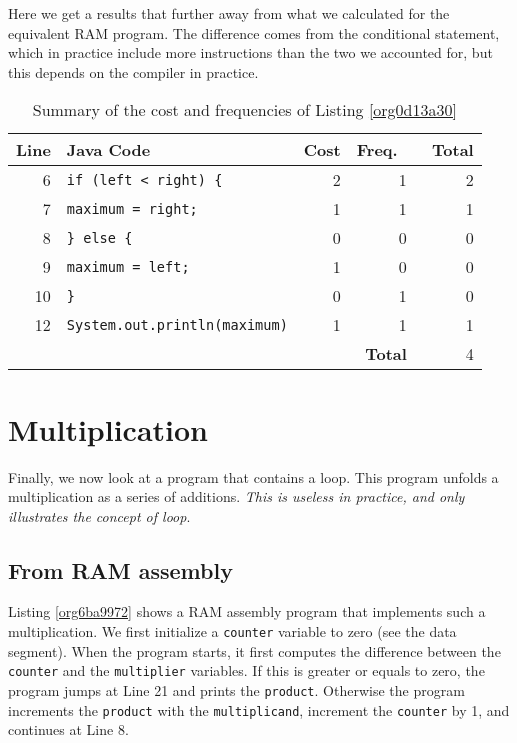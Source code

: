 \documentclass[11pt]{article}
\begin{document}
Here we get a results that further away from what we calculated for
the equivalent RAM program. The difference comes from the conditional
statement, which in practice include more instructions than the two
we accounted for, but this depends on the compiler in practice.

\begin{table}[htbp]
\caption{\label{tab:orgd479692}Summary of the cost and frequencies of Listing \ref{org0d13a30}}
\centering
\begin{tabular}{rlrrr}
Line & Java Code & Cost & Freq.  &  Total\\
\hline
6 & \texttt{if (left < right) \{} & 2 & 1 & 2\\
7 & \texttt{maximum = right;} & 1 & 1 & 1\\
8 & \texttt{\} else \{} & 0 & 0 & 0\\
9 & \texttt{maximum = left;} & 1 & 0 & 0\\
10 & \texttt{\}} & 0 & 1 & 0\\
12 & \texttt{System.out.println(maximum)} & 1 & 1 & 1\\
\hline
 &  &  & \textbf{Total} & 4\\
\end{tabular}
\end{table}


\section{Multiplication}
\label{sec:org09cba21}

Finally, we now look at a program that contains a loop. This program
unfolds a multiplication as a series of additions. \emph{This is useless in
practice, and only illustrates the concept of loop}.

\subsection{From RAM assembly}
\label{sec:orgb4863df}

Listing \ref{org6ba9972} shows a RAM assembly program that
implements such a multiplication. We first initialize a \texttt{counter}
variable to zero (see the data segment). When the program starts, it
first computes the difference between the \texttt{counter} and the
\texttt{multiplier} variables. If this is greater or equals to zero, the
program jumps at Line 21 and prints the \texttt{product}. Otherwise
the program increments the \texttt{product} with the \texttt{multiplicand},
increment the \texttt{counter} by 1, and continues at Line 8.
\end{document}
